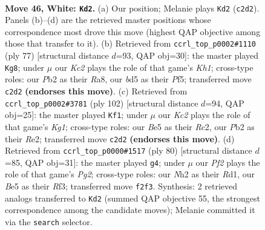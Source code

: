 \documentclass[11pt]{article}
\begin{document}
\clearpage

\begin{figure}[p]\centering
\begin{subfigure}{0.46\textwidth}\centering
\resizebox{\linewidth}{!}{%
\newchessgame
\chessboard[
  setfen={5br1/1r2k1p1/p1p4p/Pp1bBp2/2p4P/4P1P1/1PK2P1N/R5R1 w - - 8 46},
  showmover=false,
  pgfstyle=straightmove, color=movearrow, markmove={c2-d2}
]}
\caption{}
\end{subfigure}\hfill
\begin{subfigure}{0.46\textwidth}\centering
\resizebox{\linewidth}{!}{%
\newchessgame
\chessboard[
  setfen={rr5k/4p3/p2pP1p1/P1pP1pPp/2Bb1P1P/RPn5/6K1/2B4R b - - 2 39},
  showmover=false,
  pgfstyle=straightmove, color=movearrow, markmove={h8-g8}
]}
\caption{}
\end{subfigure}
\\[4pt]
\begin{subfigure}{0.46\textwidth}\centering
\resizebox{\linewidth}{!}{%
\newchessgame
\chessboard[
  setfen={rk3r2/1npb4/2p2p2/p5p1/N2B3p/1P1B1PbP/P1R1R1P1/6K1 w - - 53 52},
  showmover=false,
  pgfstyle=straightmove, color=movearrow, markmove={g1-f1}
]}
\caption{}
\end{subfigure}\hfill
\begin{subfigure}{0.46\textwidth}\centering
\resizebox{\linewidth}{!}{%
\newchessgame
\chessboard[
  setfen={1r2b3/4bpk1/p5p1/PppB3p/8/2P2R1P/5PP1/3R1K2 w - - 0 41},
  showmover=false,
  pgfstyle=straightmove, color=movearrow, markmove={g2-g4}
]}
\caption{}
\end{subfigure}
\caption{\textbf{Move 46, White: \texttt{Kd2}.} (a) Our position; Melanie plays \texttt{Kd2} (\texttt{c2d2}). Panels (b)--(d) are the retrieved master positions whose correspondence most drove this move (highest QAP objective among those that transfer to it). (b) Retrieved from \texttt{ccrl\_top\_p0002\#1110} (ply 77) [structural distance $d$=93, QAP obj=30]: the master played \texttt{Kg8}; under $\mu$ our \emph{Kc2} plays the role of that game's \emph{Kh1}; cross-type roles: our \emph{P}b2 as their \emph{R}a8, our \emph{b}d5 as their \emph{P}f5; transferred move \texttt{c2d2} \textbf{(endorses this move)}. (c) Retrieved from \texttt{ccrl\_top\_p0002\#3781} (ply 102) [structural distance $d$=94, QAP obj=25]: the master played \texttt{Kf1}; under $\mu$ our \emph{Kc2} plays the role of that game's \emph{Kg1}; cross-type roles: our \emph{B}e5 as their \emph{R}c2, our \emph{P}b2 as their \emph{R}e2; transferred move \texttt{c2d2} \textbf{(endorses this move)}. (d) Retrieved from \texttt{ccrl\_top\_p0000\#1517} (ply 80) [structural distance $d$=85, QAP obj=31]: the master played \texttt{g4}; under $\mu$ our \emph{Pf2} plays the role of that game's \emph{Pg2}; cross-type roles: our \emph{N}h2 as their \emph{R}d1, our \emph{B}e5 as their \emph{R}f3; transferred move \texttt{f2f3}. Synthesis: 2 retrieved analogs transferred to \texttt{Kd2} (summed QAP objective 55, the strongest correspondence among the candidate moves); Melanie committed it via the \texttt{search} selector.}
\label{fig:thought-m90}
\end{figure}
\end{document}
